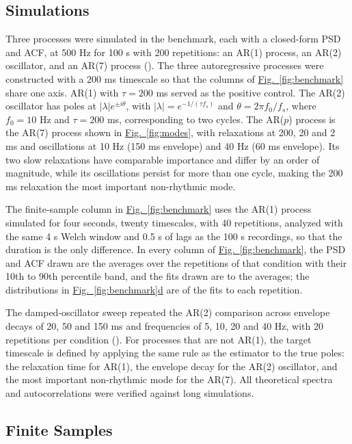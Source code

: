 \documentclass[pdflatex,sn-mathphys-num]{sn-jnl}
\newcommand{\figpanel}[2]{\hyperref[#1]{Fig.~\ref*{#1}#2}}
\begin{document}
\subsection{Simulations}

Three processes were simulated in the benchmark, each with a closed-form PSD and ACF, at 500 Hz for 100 s with 200 repetitions: an AR(1) process, an AR(2) oscillator, and an AR(7) process (). The three autoregressive processes were constructed with a 200 ms timescale so that the columns of \figpanel{fig:benchmark}{} share one axis. AR(1) with $\tau = 200$ ms served as the positive control. The AR(2) oscillator has poles at $|\lambda| e^{\pm i\theta}$, with $|\lambda| = e^{-1/(\tau f_s)}$ and $\theta = 2\pi f_0/f_s$, where $f_0 = 10$ Hz and $\tau = 200$ ms, corresponding to two cycles. The AR($p$) process is the AR(7) process shown in \figpanel{fig:modes}{}, with relaxations at 200, 20 and 2 ms and oscillations at 10 Hz (150 ms envelope) and 40 Hz (60 ms envelope). Its two slow relaxations have comparable importance and differ by an order of magnitude, while its oscillations persist for more than one cycle, making the 200 ms relaxation the most important non-rhythmic mode.

The finite-sample column in \figpanel{fig:benchmark}{} uses the AR(1) process simulated for four seconds, twenty timescales, with 40 repetitions, analyzed with the same 4 s Welch window and 0.5 s of lags as the 100 s recordings, so that the duration is the only difference. In every column of \figpanel{fig:benchmark}{}, the PSD and ACF drawn are the averages over the repetitions of that condition with their 10th to 90th percentile band, and the fits drawn are to the averages; the distributions in \figpanel{fig:benchmark}{d} are of the fits to each repetition.

The damped-oscillator sweep repeated the AR(2) comparison across envelope decays of 20, 50 and 150 ms and frequencies of 5, 10, 20 and 40 Hz, with 20 repetitions per condition (). For processes that are not AR(1), the target timescale is defined by applying the same rule as the estimator to the true poles: the relaxation time for AR(1), the envelope decay for the AR(2) oscillator, and the most important non-rhythmic mode for the AR(7). All theoretical spectra and autocorrelations were verified against long simulations.

\subsection{Finite Samples}
\end{document}
